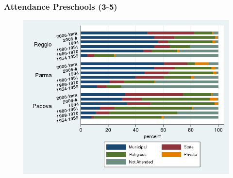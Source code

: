 \documentclass[xcolor=table]{beamer}
\begin{document}
\begin{frame}
\frametitle{Attendance Preschools (3-5)} 
\begin{center}
\begin{figure}
\includegraphics[width=1.15\textheight]{maternaType-Attend.png}
\end{figure}
\end{center}
\end{frame}
\begin{frame}

\end{frame}
\begin{frame}

\end{frame}
\begin{frame}

\end{frame}
\begin{frame}

\end{frame}
\end{document}
